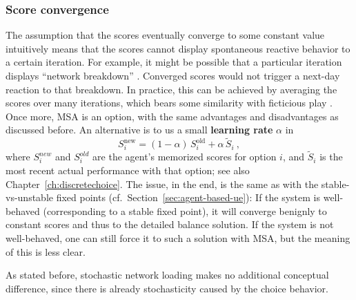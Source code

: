 \subsubsection{Score convergence}
\label{sec:score-convergence}

The assumption that the scores
eventually converge to
some constant value intuitively means that the scores cannot display
spontaneous reactive behavior to a certain iteration.  For example, it
might be possible that a particular iteration displays ``network
breakdown'' \citep{RieserNagel2008NetworkBreakdown}.  Converged scores
would not trigger a next-day reaction to that breakdown.  In practice,
this can be achieved by averaging the scores over many iterations,
which bears some similarity with ficticious play 
\citep{monderer-1996, garcia-2000}.
Once more, MSA is an option, with the same advantages and
disadvantages as discussed before.  An alternative is to us a small
\textbf{learning rate} $\alpha$ in
\begin{equation}
S_i^\text{new} = (1-\alpha) \, S_i^\text{old} + \alpha \, \tilde S_i \ ,
\end{equation}
where $S_i^{new}$ and $S_i^{old}$ are the agent's memorized scores for
option $i$, and $\tilde S_i$ is the most recent actual performance
with that option; see also Chapter~\ref{ch:discretechoice}.  
The issue, in the end, is the same as with the
stable-vs-unstable fixed points (cf.~Section~\ref{sec:agent-based-ue}):
If the system is well-behaved (corresponding to a stable fixed point),
it will converge benignly to constant scores and thus to the detailed
balance solution.  If the system is not well-behaved, one can still
force it to such a solution with MSA, but the meaning of this is less
clear.

As stated before, stochastic network loading makes no additional
conceptual difference, since there is already stochasticity caused by
the choice behavior.


